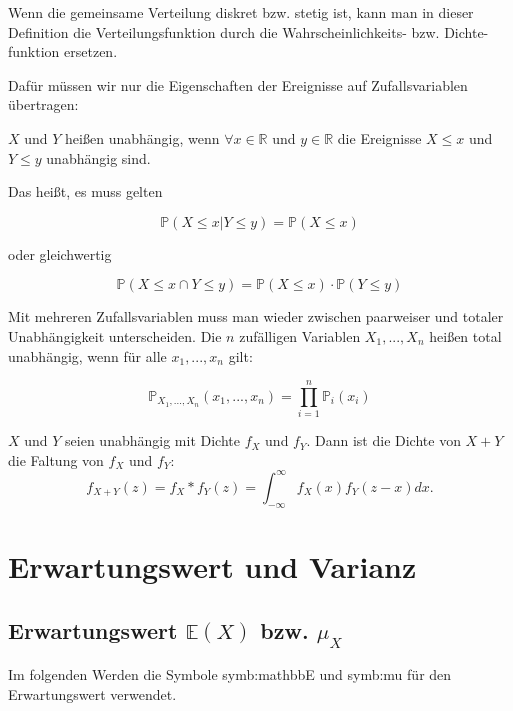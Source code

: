 {\begin{definition}
        Wenn die gemeinsame Verteilung diskret bzw. stetig ist, kann man in dieser
        Definition die Verteilungsfunktion durch die Wahrscheinlichkeits- bzw. Dichte-
        funktion ersetzen.
    \end{definition}

    Dafür müssen wir nur die Eigenschaften der Ereignisse auf
    Zufallsvariablen übertragen:

    \begin{definition}
        $X$ und $Y$ heißen unabhängig, wenn $\forall x\in \mathbb R$ und $y\in \mathbb R$
        die Ereignisse $X\le x$ und $Y\le y$ unabhängig sind.

        Das heißt, es muss gelten

        \[
            \mathbb{P}\left(X\le x|Y\le y\right)=\mathbb P(X\le x)
        \]

        oder gleichwertig

        \[
            \mathbb P\left(X\le x\cap Y\le y\right)=
            \mathbb P\left(X\le x\right)\cdot \mathbb P\left(Y\le y\right)
        \]
    \end{definition}

    Mit mehreren Zufallsvariablen muss man wieder zwischen paarweiser und
    totaler Unabhängigkeit unterscheiden. Die $n$ zufälligen Variablen $X_{1},...,X_{n}$
    heißen total unabhängig, wenn für alle $x_{1},...,x_{n}$ gilt:

    \[
    \mathbb P_{X_{1},... ,X_{n}}\left(x_{1},... ,x_{n}\right)=\prod_{i=1}^n{\mathbb P_{i}(x_{i})}
    \]

    \begin{satz}\label{satz:faltung_dichten} $X$ und $Y$ seien unabhängig mit Dichte $f_X$ und $f_Y$.
        Dann ist die Dichte von $X+Y$ die Faltung von $f_X$ und $f_Y$:
        \[f_{X+Y}(z)=f_X*f_Y(z)=\int_{-\infty}^{\infty} f_X(x)f_Y(z-x)dx.\]
    \end{satz}


    \section{Erwartungswert und Varianz}

    \subsection{Erwartungswert $\mathbb E(X)$ bzw. $\mu_{X}$}
    \label{sec:erwartungswert}
    Im folgenden Werden die Symbole \gls{symb:mathbbE} und \gls{symb:mu} für den Erwartungswert verwendet.

}
